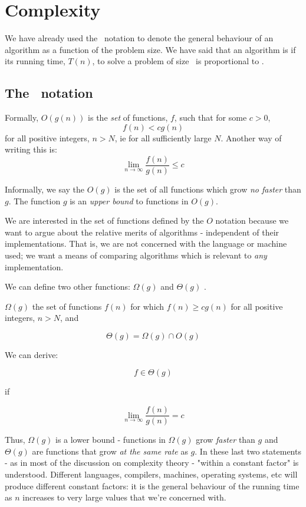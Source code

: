 %
%
%

\setcounter{section}{4}
\section{Complexity}

We have already used the \Ohx\ notation to 
denote the general behaviour of an algorithm as a 
function of the problem size.
We have said that an algorithm is
if its running time, $T(n)$, to solve a 
problem of size \nx\ is proportional
to \logn.

\subsection{The \Ohx\ notation}

Formally, 
$O(g(n))$ is the {\em set}
of functions, $f$, such that
for some $c > 0$,
\[ f(n) < c g(n) \]
for all positive integers, $n > N$,
ie for all sufficiently large $N$.
Another way of writing this is:
\[ \displaystyle{ \lim_{n \rightarrow \infty}} \frac{f(n)}{g(n)} \leq c \]

Informally, we say the $O(g)$ is the set of
all functions which grow {\it no faster} than $g$. 
The function $g$ is an {\em upper bound} to functions in $O(g)$.

We are interested in the set of functions defined by the $O$
notation because we want to argue about the relative merits of
algorithms - independent of their implementations.
That is, we are not concerned with the language or machine used;
we want a means of comparing algorithms which is relevant to 
{\it any} implementation.

We can define two other functions: $\Omega(g)$
and $\Theta(g)$ .

$\Omega(g)$ the set of functions $f(n)$ for which
$f(n) \geq c g(n)$ for all positive integers, $n > N$, and

\[ \Theta(g) = \Omega(g) \cap O(g) \]

We can derive:

\[ f \in \Theta(g) \]

if

\[ \displaystyle{ \lim_{n \rightarrow \infty}} \frac{f(n)}{g(n)} = c \]

Thus, $\Omega(g)$ is a lower bound - functions in $\Omega(g)$ grow
{\it faster} than $g$ and
$\Theta(g)$ are functions that grow {\it at the same rate} as $g$.
In these last two statements - as in most of the discussion on
complexity theory - "within a constant factor" is understood.
Different languages, compilers, machines, operating systems, etc
will produce different constant factors: it is the general behaviour
of the running time as $n$ increases to very large values that
we're concerned with.


